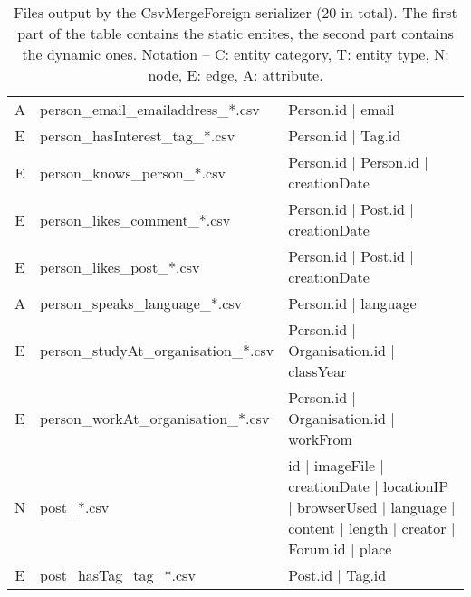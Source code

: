 \begin{table}[htb]
{\begin{tabular}{|c|l|l|}
            A                    & person\_email\_emailaddress\_*.csv   & Person.id | email                                                                                                   \\
            E                    & person\_hasInterest\_tag\_*.csv      & Person.id | Tag.id                                                                                                  \\
            E                    & person\_knows\_person\_*.csv         & Person.id | Person.id | creationDate                                                                                \\
            E                    & person\_likes\_comment\_*.csv        & Person.id | Post.id | creationDate                                                                                  \\
            E                    & person\_likes\_post\_*.csv           & Person.id | Post.id | creationDate                                                                                  \\
            A                    & person\_speaks\_language\_*.csv      & Person.id | language                                                                                                \\
            E                    & person\_studyAt\_organisation\_*.csv & Person.id | Organisation.id | classYear                                                                             \\
            E                    & person\_workAt\_organisation\_*.csv  & Person.id | Organisation.id | workFrom                                                                              \\\hline
            N                    & post\_*.csv                          & id | imageFile | creationDate | locationIP | browserUsed | language | content | length | creator | Forum.id | place \\
            E                    & post\_hasTag\_tag\_*.csv             & Post.id | Tag.id                                                                                                    \\\hline
        \end{tabular}}
    \caption{Files output by the CsvMergeForeign serializer (20 in total). The first part of the table contains the static entites, the second part contains the dynamic ones. Notation -- C: entity category, T: entity type, N: node, E: edge, A: attribute.}
    \label{table:csv_merge_foreign}
\end{table}
